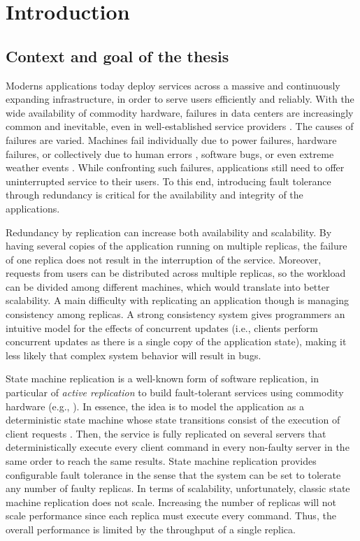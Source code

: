 \chapter[Introduction]{Introduction}

\section{Context and goal of the thesis}

Moderns applications today deploy services across a massive and
continuously expanding infrastructure, in order to serve users efficiently
and reliably. With the wide availability of commodity hardware, failures in data
centers are increasingly common and inevitable, even in well-established service
providers \cite{disruption:google}. The causes of failures are varied. Machines
fail individually due to power failures, hardware failures, or collectively due
to human errors \cite{disruption:amazon}, software bugs, or even extreme weather
events \cite{disruption:weather}. While confronting such failures, applications
still need to offer uninterrupted service to their users. To this end,
introducing fault tolerance through redundancy is critical for the availability
and integrity of the applications.

Redundancy by replication can increase both availability and scalability. By
having several copies of the application running on multiple replicas, the
failure of one replica does not result in the interruption of the service.
Moreover, requests from users can be distributed across multiple replicas, so
the workload can be divided among different machines, which would translate into
better scalability. A main difficulty with replicating an application though is
managing consistency among replicas. A strong consistency system gives
programmers an intuitive model for the effects of concurrent updates (i.e.,
clients perform concurrent updates as there is a single copy of the application
state), making it less likely that complex system behavior will result in bugs.

State machine replication is a well-known form of software replication, in
particular of \emph{active replication} to build fault-tolerant services using
commodity hardware (e.g.,
\cite{Shvachko:2003,Ghemawat:2003,Mike:2006chubby,MacCormick:2004}). In essence,
the idea is to model the application as a deterministic state machine whose
state transitions consist of the execution of client requests \cite{Lam78,
Sch90}. Then, the service is fully replicated on several servers that
deterministically execute every client command in every non-faulty server in the
same order to reach the same results. State machine replication provides
configurable fault tolerance in the sense that the system can be set to tolerate
any number of faulty replicas. In terms of scalability, unfortunately, classic
state machine replication does not scale. Increasing the number of replicas will
not scale performance since each replica must execute every command. Thus, the
overall performance is limited by the throughput of a single replica.

